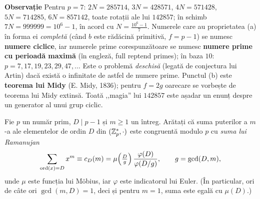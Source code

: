 \begin{solutie}
\medskip
\noindent\textbf{Observație} Pentru $p = 7$: $2N = 285714$, $3N = 428571$,
$4N = 571428$, $5N = 714285$, $6N = 857142$, toate rotații ale lui $142857$; în schimb
$7N = 999999 = 10^6 - 1$, în acord cu $N = \frac{10^6-1}{7}$. Numerele
care au proprietatea (a) în forma ei \textit{completă} (când $b$ este rădăcină primitivă,
$f = p-1$) se numesc \textbf{numere ciclice}, iar numerele prime corespunzătoare se numesc
\textbf{numere prime cu perioadă maximă} (în engleză, full reptend primes); în baza $10$:
$p = 7, 17, 19, 23, 29, 47, \dots$ Este o problemă \textit{deschisă} (legată de
conjectura lui Artin) dacă există o infinitate de astfel de numere prime. Punctul (b) este
\textbf{teorema lui Midy} (E. Midy, 1836); pentru $f = 2g$ oarecare se vorbește de
teorema lui Midy extinsă. Toată ,,magia'' lui $142857$ este așadar un enunț despre
un generator al unui grup ciclic.
\end{solutie}

\begin{problema}
Fie $p$ un număr prim, $D \mid p-1$ și $m \ge 1$ un întreg. Arătați că suma puterilor a $m$-a ale elementelor de ordin $D$ din $(\mathbb{Z}_p^*,\cdot)$ este congruentă modulo $p$ cu \emph{suma lui Ramanujan}
\[
  \sum_{\operatorname{ord}(x)=D} x^m \equiv c_D(m) = \mu\!\left(\tfrac{D}{g}\right)\frac{\varphi(D)}{\varphi(D/g)},
  \qquad g = \gcd(D,m),
\]
unde $\mu$ este funcția lui Möbius, iar $\varphi$ este indicatorul lui Euler. (În particular, ori de câte ori $\gcd(m,D)=1$, deci și pentru $m=1$, suma este egală cu $\mu(D)$.)
\end{problema}

